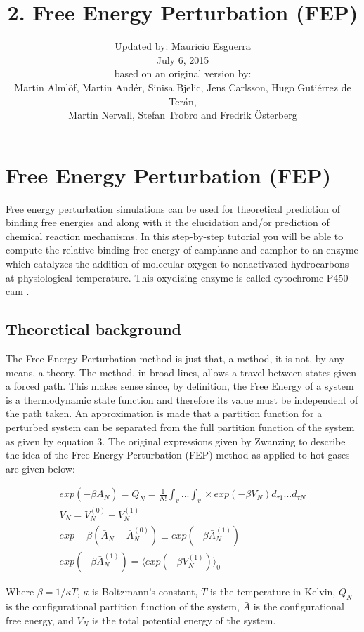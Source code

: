\documentclass[10pt,oneside,pdftex]{article}
\title{2. Free Energy Perturbation (FEP)}
\author{
\vspace{10pt}
Updated by: Mauricio Esguerra\\
July 6, 2015\\
\vspace{10pt}
\small{based on an original version by:}\\
\small{Martin Alml\"of, Martin And\'er, Sinisa Bjelic, Jens Carlsson, Hugo Guti\'errez de Ter\'an,} \\
\small{Martin Nervall, Stefan Trobro and Fredrik \"Osterberg}\\
\vspace{20pt}
}
\makeatletter
\def\printtitle{                                        %
{\color{bl} \centering \huge \sc \textbf{\@title}\par}} %
\def\printauthor{                                       %
{\centering \small \@author}}                           %
\makeatother
\begin{document}
\printtitle
\printauthor

\tableofcontents
\vspace{10 mm}
\renewcommand{\thefigure}{\arabic{figure}}


\section{Free Energy Perturbation (FEP)}
Free  energy  perturbation simulations  can  be  used for  theoretical
prediction of binding free energies  and along with it the elucidation
and/or   prediction  of   chemical  reaction   mechanisms.   In   this
step-by-step tutorial you will be able to compute the relative binding
free energy of  camphane and camphor to an enzyme  which catalyzes the
addition  of   molecular  oxygen   to  nonactivated   hydrocarbons  at
physiological temperature. This oxydizing  enzyme is called cytochrome
P450 cam \cite{schlichting2000}.

\subsection{Theoretical background} 
The Free Energy Perturbation method is just that, a method, it is not,
by any  means, a theory. The  method, in broad lines,  allows a travel
between  states given  a  forced  path.  This  makes  sense since,  by
definition,  the Free  Energy of  a  system is  a thermodynamic  state
function  and therefore  its value  must  be independent  of the  path
taken.   An approximation  is made  that  a partition  function for  a
perturbed system can be separated  from the full partition function of
the system as given by equation  3.  The original expressions given by
Zwanzing \cite{zwanzig1954}  to describe the  idea of the  Free Energy
Perturbation (FEP) method as applied to hot gases are given below:

\begin{gather}
exp(-\beta\bar{A}_{N})=Q_{N}=\frac{1}{N!}    \int_{v}  ...    \int_{v}
\times
exp(-\beta V_{N}) d_{\tau 1} ... d_{\tau N} \\
V_{N}=V_{N}^{(0)} + V_{N}^{(1)}\\
exp-\beta(\bar{A}_{N}-\bar{A}_{N}^{(0)})\equiv
exp(-\beta\bar{A}_{N}^{(1)})\\
\label{eq:zwanzig}
exp(-\beta\bar{A}_{N}^{(1)})=\langle      exp(-\beta      V_{N}^{(1)})
\rangle_{0}
\end{gather}

Where $\beta = 1/ \kappa T$,  $\kappa$ is Boltzmann's constant, $T$ is
the temperature  in Kelvin, $Q_{N}$ is the  configurational partition
function of the system, $\bar{A}$  is the configurational free energy,
and $V_{N}$ is the total potential energy of the system.
\end{document}
